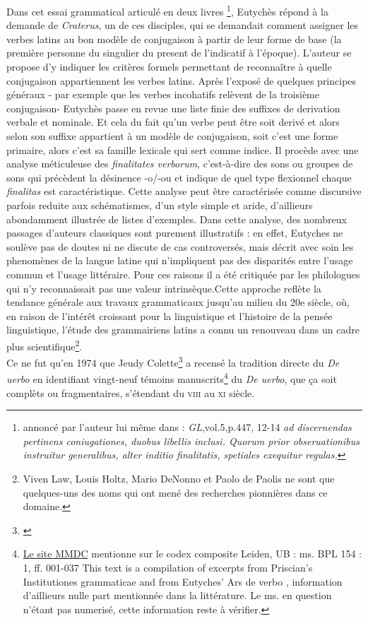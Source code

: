 \documentclass[a4paper, twoside, 12pt]{book}
\begin{document}
Dans cet essai grammatical articulé en deux livres \footnote{annoncé par l'auteur lui même dans : \textit{GL},vol.5,p.447, 12-14 \textit{ad discernendas pertinens coniugationes, duobus libellis inclusi. Quorum prior obseruationibus instruitur generalibus, alter inditio finalitatis, spetiales exequitur regulas.}}, Eutychès répond à la demande de \textit{Craterus}, un de ces disciples, qui se demandait comment assigner les verbes latins au bon modèle de conjugaison à partir de leur forme de base (la première personne du singulier du present de l'indicatif à l'époque). L'auteur se propose d'y indiquer les critères formels permettant de reconnaître à quelle conjugaison appartiennent les verbes latins. Après l'exposé de quelques principes généraux - par exemple que les verbes incohatifs relèvent de la troisième conjugaison- Eutychès passe en revue une liste finie des suffixes de derivation verbale et nominale. Et cela du fait qu'un verbe peut être soit derivé et alors selon son suffixe appartient à un modèle de conjugaison, soit c'est une forme primaire, alors c'est sa famille lexicale qui sert comme indice. Il procède avec une analyse méticuleuse des \textit{finalitates verborum}, c'est-à-dire des sons ou groupes de sons qui précèdent la désinence -o/-ou et indique de quel type flexionnel chaque \textit{finalitas} est caractéristique. Cette analyse peut être caractérisée comme discursive  parfois reduite aux schématismes, d'un style simple et aride, d'aillieurs abondamment illustrée de listes d’exemples. Dans cette analyse, des nombreux passages d'auteurs classiques sont purement illustratifs : en effet, Eutyches ne soulève pas de doutes ni ne discute de cas controversés, mais décrit avec soin les phenomènes de la langue latine qui n'impliquent pas des disparités entre l'usage commun et l'usage littéraire. Pour ces raisons il a été critiquée par les philologues qui n'y reconnaissait pas une valeur intrinsèque.Cette approche reflète la tendance générale aux travaux grammaticaux jusqu'au milieu du 20e siècle, où, en raison de l'intérêt croissant pour la linguistique et l'histoire de la pensée linguistique, l'étude des grammairiens latins a connu un renouveau dans un cadre plus scientifique\footnote{Viven Law, Louis Holtz, Mario DeNonno et Paolo de Paolis ne sont que quelques-uns des noms qui ont mené des recherches pionnières dans ce domaine.}. \\

Ce ne fut qu'en 1974 que Jeudy Colette\footnote{\cite{jeudy1974manuscrits}} a recensé la tradition directe du \textit{De uerbo} en identifiant vingt-neuf témoins manuscrits\footnote {\href{http://www.mmdc.nl/static/site/index.html}{Le site MMDC} mentionne sur le codex composite Leiden, UB : ms. BPL 154 : 1, ff. 001-037 \og{} This text is a compilation of excerpts from Priscian's Institutiones grammaticae and from Eutyches' Ars de verbo \fg{}, information d'aillieurs nulle part mentionnée dans la littérature. Le ms. en question n'étant pas numerisé, cette information reste à vérifier.} du \textit{De uerbo}, que ça soit complèts ou fragmentaires, s'étendant du \textsc{viii}\ieme{} au \textsc{xi}\ieme{} siècle.
\end{document}

